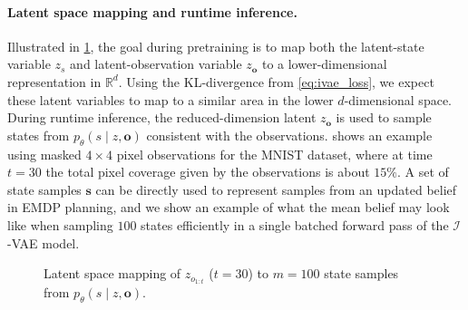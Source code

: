 \paragraph{Latent space mapping and runtime inference.}
Illustrated in \cref{fig:mapping_3d}, the goal during pretraining is to map both the latent-state variable $z_s$ and latent-observation variable $z_\mathbf{o}$ to a lower-dimensional representation in $\mathbb{R}^d$.
Using the KL-divergence from \cref{eq:ivae_loss}, we expect these latent variables to map to a similar area in the lower $d$-dimensional space.
During runtime inference, the reduced-dimension latent $z_\mathbf{o}$ is used to sample states from $p_\theta(s \mid z, \mathbf{o})$ consistent with the observations.
 shows an example using masked $4\times4$ pixel observations for the MNIST dataset, where at time $t=30$ the total pixel coverage given by the observations is about $15\%$.
A set of state samples $\mathbf{s}$ can be directly used to represent samples from an updated belief in EMDP planning, and we show an example of what the mean belief may look like when sampling $100$ states efficiently in a single batched forward pass of the $\mathcal{I}$-VAE model.


\begin{figure}[t]
    \centering
    \caption{Latent space mapping of $z_{o_{1:t}}$ ($t=30$) to $m=100$ state samples from $p_\theta(s \mid z, \mathbf{o})$.}
    \label{fig:mapping_3d}
\end{figure}


